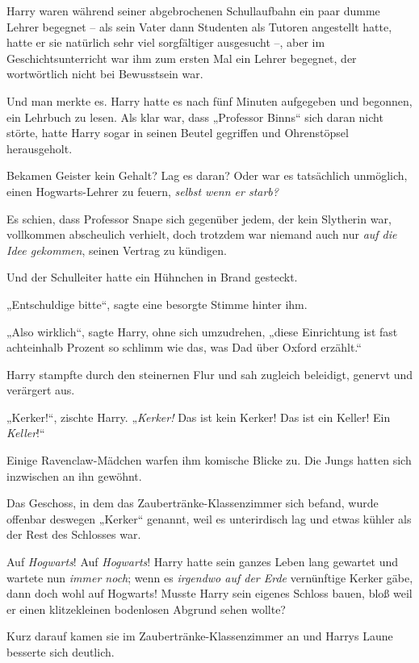 Harry waren während seiner abgebrochenen Schullaufbahn ein paar dumme Lehrer begegnet – als sein Vater dann Studenten als Tutoren angestellt hatte, hatte er sie natürlich sehr viel sorgfältiger ausgesucht –, aber im Geschichtsunterricht war ihm zum ersten Mal ein Lehrer begegnet, der wortwörtlich nicht bei Bewusstsein war. 

Und man merkte es. Harry hatte es nach fünf Minuten aufgegeben und begonnen, ein Lehrbuch zu lesen. Als klar war, dass „Professor Binns“ sich daran nicht störte, hatte Harry sogar in seinen Beutel gegriffen und Ohrenstöpsel herausgeholt. 

Bekamen Geister kein Gehalt? Lag es daran? Oder war es tatsächlich unmöglich, einen Hogwarts-Lehrer zu feuern, \emph{selbst wenn er starb?} 

Es schien, dass Professor Snape sich gegenüber jedem, der kein Slytherin war, vollkommen abscheulich verhielt, doch trotzdem war niemand auch nur \emph{auf die Idee gekommen}, seinen Vertrag zu kündigen. 

Und der Schulleiter hatte ein Hühnchen in Brand gesteckt. 

„Entschuldige bitte“, sagte eine besorgte Stimme hinter ihm. 

„Also wirklich“, sagte Harry, ohne sich umzudrehen, „diese Einrichtung ist fast achteinhalb Prozent so schlimm wie das, was Dad über Oxford erzählt.“ 

\later 

Harry stampfte durch den steinernen Flur und sah zugleich beleidigt, genervt und verärgert aus. 

„Kerker!“, zischte Harry. „\emph{Kerker!} Das ist kein Kerker! Das ist ein Keller! Ein \emph{Keller}!“ 

Einige Ravenclaw-Mädchen warfen ihm komische Blicke zu. Die Jungs hatten sich inzwischen an ihn gewöhnt. 

Das Geschoss, in dem das Zaubertränke-Klassenzimmer sich befand, wurde offenbar deswegen „Kerker“ genannt, weil es unterirdisch lag und etwas kühler als der Rest des Schlosses war. 

Auf \emph{Hogwarts}! Auf \emph{Hogwarts}! Harry hatte sein ganzes Leben lang gewartet und wartete nun \emph{immer noch}; wenn es \emph{irgendwo auf der Erde} vernünftige Kerker gäbe, dann doch wohl auf Hogwarts! Musste Harry sein eigenes Schloss bauen, bloß weil er einen klitzekleinen bodenlosen Abgrund sehen wollte? 

Kurz darauf kamen sie im Zaubertränke-Klassenzimmer an und Harrys Laune besserte sich deutlich. 


